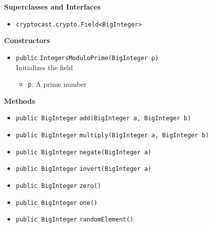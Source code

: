 \textbf{Superclasses and Interfaces}
\begin{itemize}
\item \lstinline|cryptocast.crypto.Field<BigInteger>|
\end{itemize}



\textbf{Constructors}
\begin{itemize}
\item \lstinline|public| \lstinline|IntegersModuloPrime|\lstinline|(BigInteger p)|\\
Initializes the field
\begin{itemize}
\item \lstinline|p|: A prime number
\end{itemize}



\end{itemize}


\textbf{Methods}
\begin{itemize}
\item \lstinline|public BigInteger| \lstinline|add|\lstinline|(BigInteger a, BigInteger b)|




\item \lstinline|public BigInteger| \lstinline|multiply|\lstinline|(BigInteger a, BigInteger b)|




\item \lstinline|public BigInteger| \lstinline|negate|\lstinline|(BigInteger a)|




\item \lstinline|public BigInteger| \lstinline|invert|\lstinline|(BigInteger a)|




\item \lstinline|public BigInteger| \lstinline|zero|\lstinline|()|




\item \lstinline|public BigInteger| \lstinline|one|\lstinline|()|




\item \lstinline|public BigInteger| \lstinline|randomElement|\lstinline|()|




\end{itemize}

